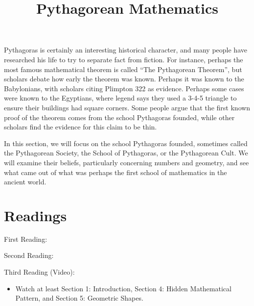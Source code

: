 \documentclass{ximera}
\title{Pythagorean Mathematics}
\begin{document}
\begin{abstract}
\end{abstract}
\maketitle

Pythagoras is certainly an interesting historical character, and many people have researched his life to try to 
separate fact from fiction.  For instance, perhaps the most famous mathematical theorem is called ``The Pythagorean 
Theorem'', but scholars debate how early the theorem was known.  Perhaps it was known to the Babylonians, with 
scholars citing Plimpton 322 as evidence.  Perhaps some cases were known to the Egyptians, where legend says they 
used a 3-4-5 triangle to ensure their buildings had square corners.  Some people argue that the first known proof of 
the theorem comes from the school Pythagoras founded, while other scholars find the evidence for this claim to be 
thin.  

In this section, we will focus on the school Pythagoras founded, sometimes called the Pythagorean Society, the 
School of Pythagoras, or the Pythagorean Cult.  We will examine their beliefs, particularly concerning numbers and 
geometry, and see what came out of what was perhaps the first school of mathematics in the ancient world.




\section{Readings}



First Reading: 

Second Reading: 

Third Reading (Video): 
\begin{itemize}
	\item Watch at least Section 1: Introduction, Section 4: Hidden Mathematical Pattern, and Section 5: Geometric Shapes.
\end{itemize}
\end{document}
